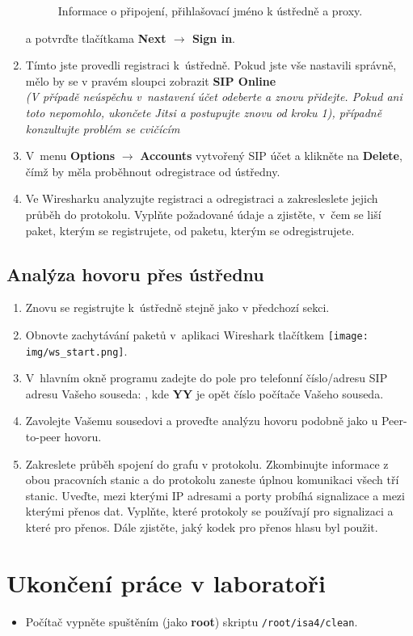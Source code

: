 \begin{enumerate}
\begin{figure}[h!]
  \caption{Informace o připojení, přihlašovací jméno k ústředně a proxy.}
  \label{fig:sip_connection}
\end{figure}
    a potvrďte tlačítkama {\bf Next $\rightarrow$ Sign in}.
    \item Tímto jste provedli registraci k ústředně. Pokud jste vše nastavili správně, mělo by se v pravém sloupci zobrazit {\bf SIP Online} \\
    {\it (V případě neúspěchu v nastavení účet odeberte a znovu přidejte. Pokud ani toto nepomohlo, ukončete Jitsi a postupujte znovu od kroku 1), případně konzultujte problém se cvičícím}
    \item V menu {\bf Options} $\rightarrow$ {\bf Accounts} vytvořený SIP účet a klikněte na {\bf Delete}, čímž by měla proběhnout odregistrace od ústředny.
    \item Ve Wiresharku analyzujte registraci a odregistraci a zakresleslete jejich průběh do protokolu. Vyplňte požadované údaje a zjistěte, v čem se liší paket, kterým se registrujete, od paketu, kterým se odregistrujete.
\end{enumerate}


\subsection{Analýza hovoru přes ústřednu}
\begin{enumerate}
    \item Znovu se registrujte k ústředně stejně jako v předchozí sekci.
    \item Obnovte zachytávání paketů v aplikaci Wireshark tlačítkem \texttt{[image: img/ws\_start.png]}.
    \item V hlavním okně programu zadejte do pole pro telefonní číslo/adresu SIP adresu Vašeho souseda: , kde {\bf YY} je opět číslo počítače Vašeho souseda.
    \item Zavolejte Vašemu sousedovi a proveďte analýzu hovoru podobně jako u Peer-to-peer hovoru.
    \item Zakreslete průběh spojení do grafu v protokolu. Zkombinujte informace
      z obou pracovních stanic a do protokolu zaneste úplnou komunikaci všech
      tří stanic. Uveďte, mezi kterými IP adresami a porty probíhá signalizace a mezi kterými přenos dat. Vyplňte, které protokoly se používají pro signalizaci a které pro přenos. Dále zjistěte, jaký kodek pro přenos hlasu byl použit.
\end{enumerate}

\section{Ukončení práce v laboratoři}
\begin{itemize}
  \item Počítač vypněte spuštěním (jako {\bf root}) skriptu {\tt /root/isa4/clean}.
\end{itemize}
